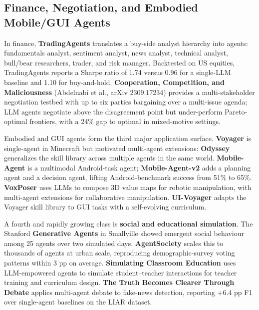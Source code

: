 \documentclass{article}
\begin{document}
\subsection{Finance, Negotiation, and Embodied Mobile/GUI Agents}\label{finance-negotiation-and-embodied-mobilegui-agents}

In finance, \textbf{TradingAgents} \citep{xiao2024tradingagentsmulti} translates a buy-side analyst hierarchy into agents: fundamentals analyst, sentiment analyst, news analyst, technical analyst, bull/bear researchers, trader, and risk manager. Backtested on US equities, TradingAgents reports a Sharpe ratio of 1.74 versus 0.96 for a single-LLM baseline and 1.10 for buy-and-hold. \textbf{Cooperation, Competition, and Maliciousness} (Abdelnabi et al., arXiv 2309.17234) provides a multi-stakeholder negotiation testbed with up to six parties bargaining over a multi-issue agenda; LLM agents negotiate above the disagreement point but under-perform Pareto-optimal frontiers, with a 24\% gap to optimal in mixed-motive settings.

Embodied and GUI agents form the third major application surface. \textbf{Voyager} \citep{wang2023voyageranopenended} is single-agent in Minecraft but motivated multi-agent extensions: \textbf{Odyssey} \citep{liu20242024} generalizes the skill library across multiple agents in the same world. \textbf{Mobile-Agent} \citep{wang20242024} is a multimodal Android-task agent; \textbf{Mobile-Agent-v2} adds a planning agent and a decision agent, lifting Android-benchmark success from 51\% to 65\%. \textbf{VoxPoser} \citep{huang2023agentcodermultiage} uses LLMs to compose 3D value maps for robotic manipulation, with multi-agent extensions for collaborative manipulation. \textbf{UI-Voyager} \citep{lin20262026} adapts the Voyager skill library to GUI tasks with a self-evolving curriculum.

A fourth and rapidly growing class is \textbf{social and educational simulation}. The Stanford \textbf{Generative Agents} in Smallville \citep{park2023generativeagentsin} showed emergent social behaviour among 25 agents over two simulated days. \textbf{AgentSociety} \citep{piao20252025} scales this to thousands of agents at urban scale, reproducing demographic-survey voting patterns within 3 pp on average. \textbf{Simulating Classroom Education} \citep{zhang20252025} uses LLM-empowered agents to simulate student--teacher interactions for teacher training and curriculum design. \textbf{The Truth Becomes Clearer Through Debate} \citep{liu20252025} applies multi-agent debate to fake-news detection, reporting +6.4 pp F1 over single-agent baselines on the LIAR dataset.
\end{document}
